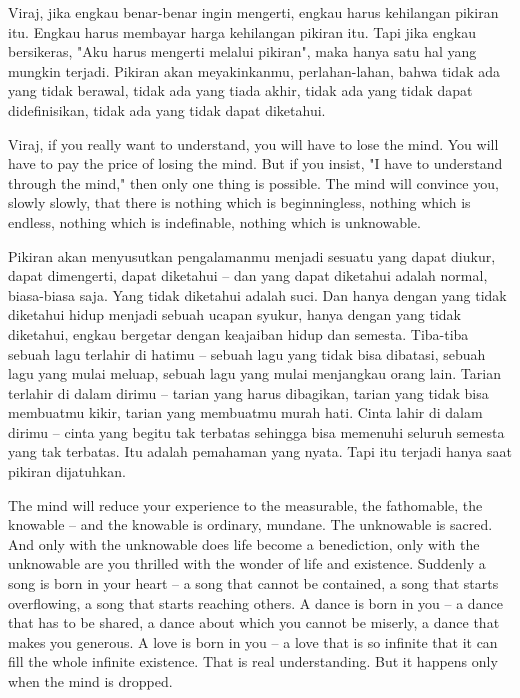 \bahasa
Viraj, jika engkau benar-benar ingin mengerti, engkau harus kehilangan pikiran itu. Engkau harus membayar harga kehilangan pikiran itu. Tapi jika engkau bersikeras, "Aku harus mengerti melalui pikiran", maka hanya satu hal yang mungkin terjadi. Pikiran akan meyakinkanmu, perlahan-lahan, bahwa tidak ada yang tidak berawal, tidak ada yang tiada akhir, tidak ada yang tidak dapat didefinisikan, tidak ada yang tidak dapat diketahui.

\english
Viraj, if you really want to understand, you will have to lose the mind. You will have to pay the price of losing the mind. But if you insist, "I have to understand through the mind," then only one thing is possible. The mind will convince you, slowly slowly, that there is nothing which is beginningless, nothing which is endless, nothing which is indefinable, nothing which is unknowable.

\bahasa
Pikiran akan menyusutkan pengalamanmu menjadi sesuatu yang dapat diukur, dapat dimengerti, dapat diketahui -- dan yang dapat diketahui adalah normal, biasa-biasa saja. Yang tidak diketahui adalah suci. Dan hanya dengan yang tidak diketahui hidup menjadi sebuah ucapan syukur, hanya dengan yang tidak diketahui, engkau bergetar dengan keajaiban hidup dan semesta. Tiba-tiba sebuah lagu terlahir di hatimu -- sebuah lagu yang tidak bisa dibatasi, sebuah lagu yang mulai meluap, sebuah lagu yang mulai menjangkau orang lain. Tarian terlahir di dalam dirimu -- tarian yang harus dibagikan, tarian yang tidak bisa membuatmu kikir, tarian yang membuatmu murah hati. Cinta lahir di dalam dirimu -- cinta yang begitu tak terbatas sehingga bisa memenuhi seluruh semesta yang tak terbatas. Itu adalah pemahaman yang nyata. Tapi itu terjadi hanya saat pikiran dijatuhkan.

\english
The mind will reduce your experience to the measurable, the fathomable, the knowable -- and the knowable is ordinary, mundane. The unknowable is sacred. And only with the unknowable does life become a benediction, only with the unknowable are you thrilled with the wonder of life and existence. Suddenly a song is born in your heart -- a song that cannot be contained, a song that starts overflowing, a song that starts reaching others. A dance is born in you -- a dance that has to be shared, a dance about which you cannot be miserly, a dance that makes you generous. A love is born in you -- a love that is so infinite that it can fill the whole infinite existence. That is real understanding. But it happens only when the mind is dropped.

